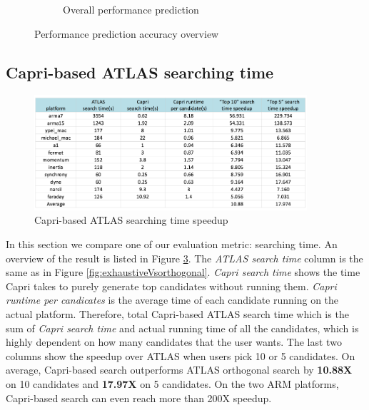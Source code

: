 \begin{figure}[bhp]
\begin{subfigure}[b]{1.0\linewidth}
      \caption{Overall performance prediction}
      \label{fig:overall_perf}
    \end{subfigure}
    \caption{Performance prediction accuracy overview}
  \end{figure}



  \subsection{Capri-based ATLAS searching time}
  \label{sec:capri_atlas_searching}
  \begin{figure}[tbhp]
    \centering
    \includegraphics[width=0.9\textwidth]{images/timespeedup.png}
    \caption{Capri-based ATLAS searching time speedup}
    \label{fig:search_time}
  \end{figure}

  In this section we compare one of our evaluation metric: searching time. An overview of the result is listed in
  Figure \ref{fig:search_time}. The \textit{ATLAS search time} column is the same as in Figure \ref{fig:exhaustiveVsorthogonal}.
  \textit{Capri search time} shows the time Capri takes to purely generate top candidates without running them.
  \textit{Capri runtime per candicates} is the average time of each candidate running on the actual platform.
  Therefore, total Capri-based ATLAS search time which is the sum of \textit{Capri search time} and actual running time of all the candidates,
  which is
  highly dependent on how many candidates that the user wants. The last two columns show the speedup over ATLAS when users pick
  10 or 5 candidates. On average, Capri-based search outperforms ATLAS orthogonal search by \textbf{10.88X} on 10 candidates and \textbf{17.97X} on
  5 candidates. On the two ARM platforms, Capri-based search can even reach more than 200X speedup.


